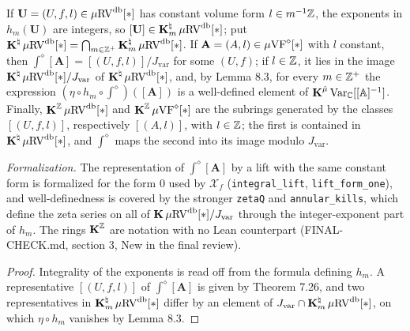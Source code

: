 \setcounter{theorem}{3}
\begin{remark}
\label{dia-to-db-dag}
\leanok
{}
If $\mathbf U = (U, f, l) \in \mu\mathrm{RV}^{\operatorname{db}}[*]$ has constant volume form $l \in m^{-1}\mathbb{Z}$, the exponents in $h_m(\mathbf U)$ are integers, so $[\mathbf U] \in \operatorname{\mathbf{K}}^\natural_m \mu\mathrm{RV}^{\operatorname{db}}[*]$; put $\operatorname{\mathbf{K}}^\natural \mu\mathrm{RV}^{\operatorname{db}}[*] = \bigcap_{m \in \mathbb{Z}^+} \operatorname{\mathbf{K}}^\natural_m \mu\mathrm{RV}^{\operatorname{db}}[*]$. If $\mathbf A = (A, l) \in \mu\mathrm{VF}^\diamond[*]$ with $l$ constant, then $\int^\diamond [\mathbf A] = [(U, f, l)]/J_{\mathrm{var}}$ for some $(U, f)$; if $l \in \mathbb{Z}$, it lies in the image $\operatorname{\mathbf{K}}^\natural \mu\mathrm{RV}^{\operatorname{db}}[*]/J_{\mathrm{var}}$ of $\operatorname{\mathbf{K}}^\natural \mu\mathrm{RV}^{\operatorname{db}}[*]$, and, by Lemma 8.3, for every $m \in \mathbb{Z}^+$ the expression $(\eta \circ h_m \circ \int^\diamond)([\mathbf A])$ is a well-defined element of $\operatorname{\mathbf{K}}^{\hat\mu}\mathrm{Var}_{\mathbb{C}}[[\mathbb{A}]^{-1}]$. Finally, $\operatorname{\mathbf{K}}^{\mathbb{Z}} \mu\mathrm{RV}^{\operatorname{db}}[*]$ and $\operatorname{\mathbf{K}}^{\mathbb{Z}} \mu\mathrm{VF}^\diamond[*]$ are the subrings generated by the classes $[(U, f, l)]$, respectively $[(A, l)]$, with $l \in \mathbb{Z}$; the first is contained in $\operatorname{\mathbf{K}}^\natural \mu\mathrm{RV}^{\operatorname{db}}[*]$, and $\int^\diamond$ maps the second into its image modulo $J_{\mathrm{var}}$.

\emph{Formalization.} The representation of $\int^\diamond[\mathbf A]$ by a lift with the same constant form is formalized for the form $0$ used by $\mathcal X_f$ (\texttt{integral\_lift}, \texttt{lift\_form\_one}), and well-definedness is covered by the stronger \texttt{zetaQ} and \texttt{annular\_kills}, which define the zeta series on all of $\operatorname{\mathbf{K}} \mu\mathrm{RV}^{\operatorname{db}}[*]/J_{\mathrm{var}}$ through the integer-exponent part of $h_m$. The rings $\operatorname{\mathbf{K}}^{\mathbb{Z}}$ are notation with no Lean counterpart (FINAL-CHECK.md, section 3, New in the final review).
\end{remark}

\begin{proof}
Integrality of the exponents is read off from the formula defining $h_m$. A representative $[(U, f, l)]$ of $\int^\diamond[\mathbf A]$ is given by Theorem 7.26, and two representatives in $\operatorname{\mathbf{K}}^\natural_m \mu\mathrm{RV}^{\operatorname{db}}[*]$ differ by an element of $J_{\mathrm{var}} \cap \operatorname{\mathbf{K}}^\natural_m \mu\mathrm{RV}^{\operatorname{db}}[*]$, on which $\eta \circ h_m$ vanishes by Lemma 8.3.
\end{proof}

